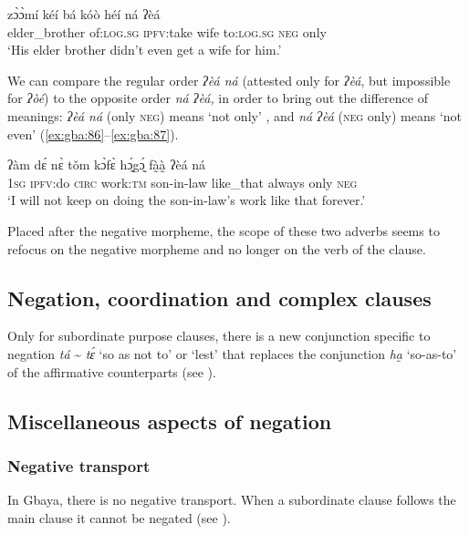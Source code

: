 \documentclass[output=paper,colorlinks=true, citecolor=brown]{langscibook}
\begin{document}
\ea\label{ex:gba:87}
    \gll zɔ̀ɔ̀mí kéí bá kóò héí ná ʔèá \\ 
         elder\_brother of:\textsc{log.sg} \textsc{ipfv}:take wife to:\textsc{log.sg} \textsc{neg} only \\
    \glt ‘His elder brother didn’t even get a wife for him.’
\z 

We can compare the regular order \textit{ʔèá ná} (attested only for \textit{ʔèá}, but impossible for \textit{ʔòé}) to the opposite order \textit{ná ʔèá,} in order to bring out the difference of meanings: \textit{ʔèá ná} (only \textsc{neg}) means ‘not only’ , and \textit{ná ʔèá} (\textsc{neg} only) means ‘not even’ (\ref{ex:gba:86}--\ref{ex:gba:87}).

\ea\label{ex:gba:88}
    \gll ʔàm dɛ́ nɛ̀ tǒm kɔ̀fɛ̀ hɔ̰́gɔ̰́ fà̰à̰   ʔèá ná \\ 
         1\textsc{sg} \textsc{ipfv}:do \textsc{circ} work:\textsc{tm} son-in-law like\_that always only \textsc{neg} \\
    \glt ‘I will not keep on doing the son-in-law’s work like that forever.’
\z 

Placed after the negative morpheme, the scope of these two adverbs seems to refocus on the negative morpheme and no longer on the verb of the clause. 

\subsection{Negation, coordination and complex clauses}\label{sec:gba:4.5}

Only for subordinate purpose clauses, there is a new conjunction specific to negation \textit{tá} {\textasciitilde} \textit{tɛ́} ‘so as not to’ or ‘lest’ that replaces the conjunction \textit{ha̰} ‘so-as-to’ of the affirmative counterparts (see ).

\subsection{Miscellaneous aspects of negation}\label{sec:gba:4.6}

\subsubsection{Negative transport}\label{sec:gba:4.6.1}

In Gbaya, there is no negative transport. When a subordinate clause follows the main clause it cannot be negated (see ).
\end{document}
